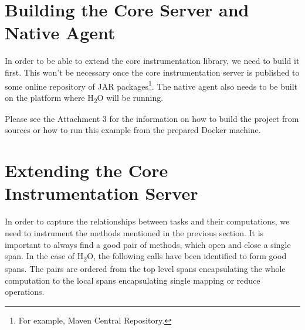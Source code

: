 \section{Building the Core Server and Native Agent}
In order to be able to extend the core instrumentation library, we need to build it first. This won't be necessary once the core instrumentation server is published to some online repository of JAR packages\footnote{For example, Maven Central Repository.}. The native agent also needs to be built on the platform where H\textsubscript{2}O will be running. 

Please see the Attachment 3 for the information on how to build the project from sources or how to run this example from the prepared Docker machine. 

\section{Extending the Core Instrumentation Server}
In order to capture the relationships between tasks and their computations, we need to instrument the methods mentioned in the previous section. It is important to always find a good pair of methods, which open and close a single span. In the case of H\textsubscript{2}O, the following calls have been identified to form good spans. The pairs are ordered from the top level spans encapsulating the whole computation to the local spans encapsulating single mapping or reduce operations.

